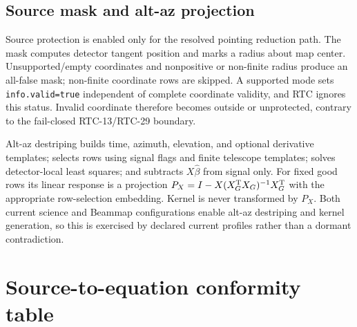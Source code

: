 \documentclass[11pt]{article}
\newcommand{\code}[1]{\nolinkurl{#1}}
\begin{document}
\subsection{Source mask and alt-az projection}

Source protection is enabled only for the resolved pointing reduction path.
The mask computes detector tangent position and marks a radius about map
center.  Unsupported/empty coordinates and nonpositive or non-finite radius
produce an all-false mask; non-finite coordinate rows are skipped.  A supported
mode sets \code{info.valid=true} independent of complete coordinate validity,
and RTC ignores this status.  Invalid coordinate therefore becomes outside or
unprotected, contrary to the fail-closed RTC-13/RTC-29 boundary.

Alt-az destriping builds time, azimuth, elevation, and optional derivative
templates; selects rows using signal flags and finite telescope templates;
solves detector-local least squares; and subtracts $X\widehat\beta$ from signal
only.  For fixed good rows its linear response is a projection
$P_X=I-X(X_G^{\rm T}X_G)^{-1}X_G^{\rm T}$ with the appropriate row-selection
embedding.  Kernel is never transformed by $P_X$.  Both current science and
Beammap configurations enable alt-az destriping and kernel generation, so this
is exercised by declared current profiles rather than a dormant contradiction.

\section{Source-to-equation conformity table}
\end{document}
